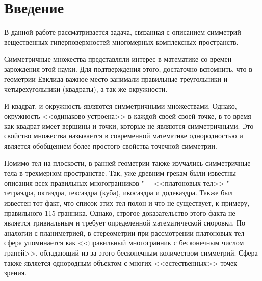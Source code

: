 \documentclass[a4paper,14pt]{extarticle}
\begin{document}



\section*{\centering Введение}
В данной работе рассматривается задача, связанная с описанием симметрий вещественных гиперповерхностей многомерных комплексных пространств.

Симметричные множества представляли интерес в математике со времен зарождения этой науки. Для подтверждения этого, достаточно вспомнить, что в геометрии Евклида важное место занимали правильные треугольники и четырехугольники (квадраты), а так же окружности. 

И квадрат, и окружность являются симметричными множествами. Однако, окружность <<одинаково устроена>> в каждой своей своей точке, в то время как квадрат имеет вершины и точки, которые не являются симметричными. Это свойство множества называется в современной математике однородностью и является обобщением более простого свойства точечной симметрии.

Помимо тел на плоскости, в ранней геометрии также изучались симметричные тела в трехмерном пространстве. Так, уже древним грекам были известны описания всех правильных многогранников "--- <<платоновых тел>> "--- тетраэдра, октаэдра, гексаэдра (куба), икосаэдра и додекаэдра. Также был известен тот факт, что список этих тел полон и что не существует, к примеру, правильного 115-гранника. Однако, строгое доказательство этого факта не является тривиальным и требует определенной математической сноровки. По аналогии с планиметрией, в стереометрии при рассмотрении платоновых тел сфера упоминается как <<правильный многогранник с бесконечным числом граней>>, обладающий из-за этого бесконечным количеством симметрий. Сфера также является однородным объектом с многих <<естественных>> точек зрения.
\end{document}
